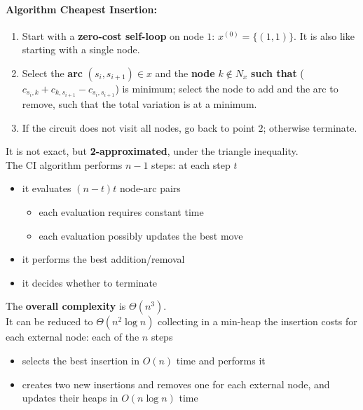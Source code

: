 \newpage

\paragraph{Algorithm Cheapest Insertion:}
\begin{enumerate}
	\item Start with a \textbf{zero-cost self-loop} on node $1$: $x^{(0)} = \{(1, 1)\}$. It is also like starting with a single node.
	
	\item Select the \textbf{arc} $(s_i , s_{i+1}) \in x$ and the \textbf{node} $k \notin N_x$ \textbf{such that} ($c_{s_i, k} + c_{k, s_{i+1}} − c_{s_i ,s_{i+1}}$) is minimum; select the node to add and the arc to remove, such that the total variation is at a minimum.
	
	\item If the circuit does not visit all nodes, go back to point $2$; otherwise terminate.
\end{enumerate}
It is not exact, but \textbf{2-approximated}, under the triangle inequality.\\

The CI algorithm performs $n - 1$ steps: at each step $t$
\begin{itemize}
	\item it evaluates $(n - t) t$ node-arc pairs
	\begin{itemize}
		\item each evaluation requires constant time
		\item each evaluation possibly updates the best move
	\end{itemize}
	\item it performs the best addition/removal
	\item it decides whether to terminate
\end{itemize}

The \textbf{overall complexity} is $\Theta (n^3)$.\\

It can be reduced to $\Theta (n^2 \log n)$ collecting in a min-heap the insertion costs for each external node: each of the $n$ steps
\begin{itemize}
	\item selects the best insertion in $O (n)$ time and performs it
	\item creates two new insertions and removes one for each external node, and updates their heaps in $O (n \log n)$ time
\end{itemize}

